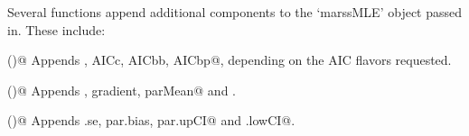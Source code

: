 Several functions append additional components to the `marssMLE' object passed in. These include:

  \begin{description}
  \item{\verb@MARSSaic()@}{ Appends \verb@AIC, AICc, AICbb, AICbp@, depending on the AIC flavors requested. }
  \item{\verb@MARSShessian()@}{ Appends \verb@Hessian, gradient, parMean@ and \verb@parSigma@. }
  \item{\verb@MARSSparamCIs()@}{ Appends \verb@par.se, par.bias, par.upCI@ and \verb@par.lowCI@.}
  \end{description}


